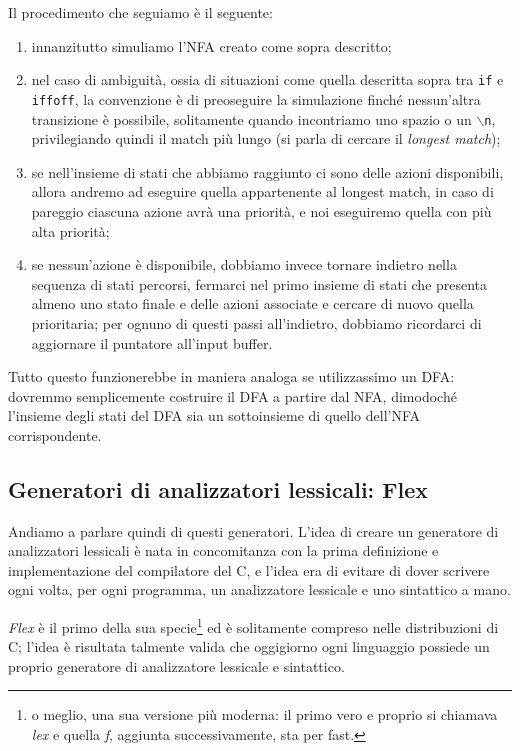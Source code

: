 \documentclass[class=book, crop=false, oneside, 12pt]{standalone}
\begin{document}
Il procedimento che seguiamo è il seguente:
\begin{enumerate}
    \item innanzitutto simuliamo l'NFA creato come sopra descritto;
    \item nel caso di ambiguità, ossia di situazioni come quella descritta sopra tra \texttt{if} e \texttt{iffoff}, la convenzione è di preoseguire la simulazione finché nessun’altra transizione è possibile, solitamente quando incontriamo uno spazio o un \texttt{\(\backslash\)n}, privilegiando quindi il match più lungo (si parla di cercare il \emph{longest match});
    \item se nell'insieme di stati che abbiamo raggiunto ci sono delle azioni disponibili, allora andremo ad eseguire quella appartenente al longest match, in caso di pareggio ciascuna azione avrà una priorità, e noi eseguiremo quella con più alta priorità;
    \item se nessun'azione è disponibile, dobbiamo invece tornare indietro nella sequenza di stati percorsi, fermarci nel primo insieme di stati che presenta almeno uno stato finale e delle azioni associate e cercare di nuovo quella prioritaria; per ognuno di questi passi all'indietro, dobbiamo ricordarci di aggiornare il puntatore all'input buffer.
\end{enumerate}

Tutto questo funzionerebbe in maniera analoga se utilizzassimo un DFA: dovremmo semplicemente costruire il DFA a partire dal NFA, dimodoché l'insieme degli stati del DFA sia un sottoinsieme di quello dell'NFA corrispondente.

\subsection{Generatori di analizzatori lessicali: Flex}
Andiamo a parlare quindi di questi generatori. L'idea di creare un generatore di analizzatori lessicali è nata in concomitanza con la prima definizione e implementazione del compilatore del C, e l'idea era di evitare di dover scrivere ogni volta, per ogni programma, un analizzatore lessicale e uno sintattico a mano.

\emph{Flex} è il primo della sua specie\footnote{o meglio, una sua versione più moderna: il primo vero e proprio si chiamava \emph{lex} e quella \emph{f}, aggiunta successivamente, sta per fast.} ed è solitamente compreso nelle distribuzioni di C; l'idea è risultata talmente valida che oggigiorno ogni linguaggio possiede un proprio generatore di analizzatore lessicale e sintattico.
\end{document}
